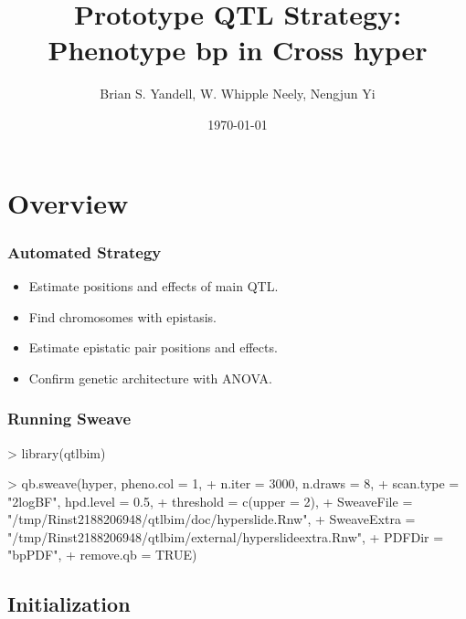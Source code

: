 \documentclass{beamer}
\begin{document}
\title{Prototype QTL Strategy: Phenotype
bp
in Cross
hyper}
\author{Brian S. Yandell, W. Whipple Neely, Nengjun Yi}
\date{\today}

\frame{\titlepage}

\section[Outline]{}
\frame{\tableofcontents}

\section{Overview}

\frame
{
  \frametitle{Automated Strategy}

  \begin{itemize}
  \item Estimate positions and effects of main QTL.
  \item Find chromosomes with epistasis.
  \item Estimate epistatic pair positions and effects.
  \item Confirm genetic architecture with ANOVA.
  \end{itemize}
}

\begin{frame}[fragile]
  \frametitle{Running Sweave}


\tiny

\begin{Schunk}
\begin{Sinput}
> library(qtlbim)
\end{Sinput}
\end{Schunk}
\begin{Schunk}
\begin{Sinput}
> qb.sweave(hyper, pheno.col = 1,
+  n.iter = 3000, n.draws = 8,
+  scan.type = "2logBF", hpd.level = 0.5,
+  threshold = c(upper = 2),
+  SweaveFile = "/tmp/Rinst2188206948/qtlbim/doc/hyperslide.Rnw",
+  SweaveExtra = "/tmp/Rinst2188206948/qtlbim/external/hyperslideextra.Rnw",
+  PDFDir = "bpPDF",
+  remove.qb = TRUE)
\end{Sinput}
\end{Schunk}

\end{frame}

\subsection{Initialization}
\end{document}
